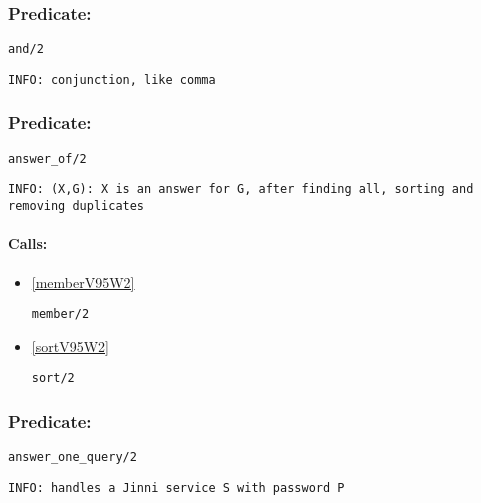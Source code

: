 \subsubsection{Predicate:} \label{andV95W2}

\begin{verbatim}
and/2
\end{verbatim}

{\small \begin{verbatim}
INFO: conjunction, like comma

\end{verbatim}}

\subsubsection{Predicate:} \label{answerV95WofV95W2}

\begin{verbatim}
answer_of/2
\end{verbatim}

{\small \begin{verbatim}
INFO: (X,G): X is an answer for G, after finding all, sorting and removing duplicates

\end{verbatim}}
\paragraph{Calls:} 
\begin{itemize}
\item \ref{memberV95W2} 
\begin{verbatim}
member/2
\end{verbatim}

\item \ref{sortV95W2} 
\begin{verbatim}
sort/2
\end{verbatim}

\end{itemize}

\subsubsection{Predicate:} \label{answerV95WoneV95WqueryV95W2}

\begin{verbatim}
answer_one_query/2
\end{verbatim}

{\small \begin{verbatim}
INFO: handles a Jinni service S with password P

\end{verbatim}}
